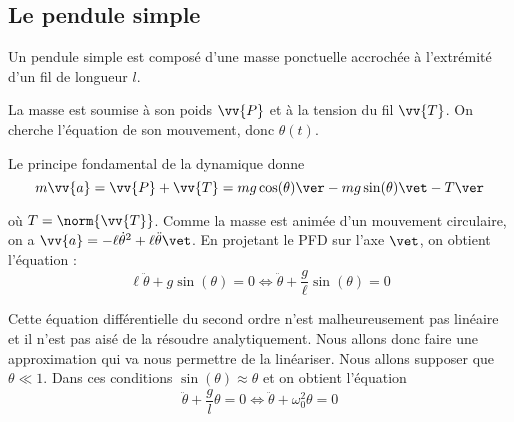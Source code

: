 \documentclass{cours}
\begin{document}
\subsection{Le pendule simple}%
\label{sub:le_pendule_simple}

Un pendule simple est composé d'une masse ponctuelle accrochée à l'extrémité d'un fil de longueur $l$. 
\begin{center}
\end{center}
La masse est soumise à son poids $\vv{P}$ et à la tension du fil $\vv{T}$. On cherche l'équation de son mouvement, donc $\theta(t)$. 

Le principe fondamental de la dynamique donne 
\begin{equation}
m \vv{a} = \vv{P} + \vv{T} = mg\cos(\theta)\ver - mg\sin(\theta)\vet -T\ver
\end{equation}

où $T = \norm{\vv{T}}$. 
Comme la masse est animée d'un mouvement circulaire, on a $\vv{a} = -\ell \dot{\theta}^2 + \ell \ddot{\theta} \vet$. En projetant le PFD sur l'axe $\vet$, on obtient l'équation :
\begin{equation}
\ell \ddot{\theta} + g\sin(\theta) = 0 \Leftrightarrow \ddot{\theta} + \frac{g}{\ell}\sin(\theta) = 0
\label{eq:pendule}
\end{equation}

Cette équation différentielle du second ordre n'est malheureusement pas linéaire et il n'est pas aisé de la résoudre analytiquement. Nous allons donc faire une approximation qui va nous permettre de la linéariser. Nous allons supposer que $\theta\ll 1$. Dans ces conditions $\sin(\theta) \approx \theta$ et on obtient l'équation 
\begin{equation}
\ddot{\theta} + \frac{g}{l} \theta = 0 \Leftrightarrow \ddot{\theta} + \omega_0^2 \theta = 0
\end{equation}
\end{document}
